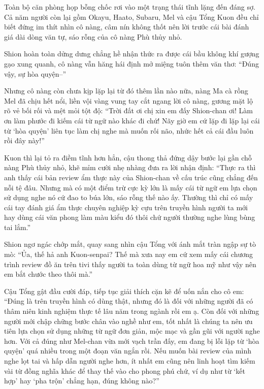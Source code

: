 \documentclass[../main.tex]{subfiles}
\begin{document}
Toàn bộ căn phòng họp bỗng chốc rơi vào một trạng thái tĩnh lặng đến đáng sợ. Cả năm người còn lại gồm Okayu, Haato, Subaru, Mel và cậu Tổng Kuon đều chỉ biết đứng im thít nhìn cô nàng, câm nín không thốt nên lời trước cái bài đánh giá dài dòng văn tự, sáo rỗng của cô nàng Phù thủy nhỏ.


Shion hoàn toàn dửng dưng chẳng hề nhận thức ra được cái bầu không khí gượng gạo xung quanh, cô nàng vẫn hăng hái định mở miệng tuôn thêm văn thơ: ``Đúng vậy, sự hòa quyện--''

Nhưng cô nàng còn chưa kịp lặp lại từ đó thêm lần nào nữa, nàng Ma cà rồng Mel đã chịu hết nổi, liền vội vàng vung tay cắt ngang lời cô nàng, gương mặt lộ rõ vẻ bối rối và mệt mỏi tột độ: ``Trời đất ơi chị xin em đấy Shion-chan ơi! Làm ơn làm phước đi kiếm cái từ ngữ nào khác đi chứ! Nãy giờ em cứ lặp đi lặp lại cái từ `hòa quyện' liên tục làm chị nghe mà muốn rối não, nhức hết cả cái đầu luôn rồi đây này!''

Kuon thì lại tỏ ra điềm tĩnh hơn hẳn, cậu thong thả đứng dậy bước lại gần chỗ nàng Phù thủy nhỏ, khẽ mỉm cười nhẹ nhàng đưa ra lời nhận định: ``Thực ra thì anh thấy cái bản review ẩm thực này của Shion-chan về cấu trúc cũng chẳng đến nỗi tệ đâu. Nhưng mà có một điểm trừ cực kỳ lớn là mấy cái từ ngữ em lựa chọn sử dụng nghe nó cứ đao to búa lớn, sáo rỗng thế nào ấy. Thường thì chỉ có mấy cái tay đánh giá ẩm thực chuyên nghiệp kỳ cựu trên truyền hình người ta mới hay dùng cái văn phong làm màu kiểu đó thôi chứ người thường nghe lùng bùng tai lắm.''

Shion ngơ ngác chớp mắt, quay sang nhìn cậu Tổng với ánh mắt tràn ngập sự tò mò: ``Ủa, thế hả anh Kuon-senpai? Thế mà xưa nay em cứ xem mấy cái chương trình review đồ ăn trên tivi thấy người ta toàn dùng từ ngữ hoa mỹ như vậy nên em bắt chước theo thôi mà.''

Cậu Tổng gật đầu cười đáp, tiếp tục giải thích cặn kẽ để uốn nắn cho cô em: ``Đúng là trên truyền hình có dùng thật, nhưng đó là đối với những người đã có thâm niên kinh nghiệm thực tế lâu năm trong ngành rồi em ạ. Còn đối với những người mới chập chững bước chân vào nghề như em, tốt nhất là chúng ta nên ưu tiên lựa chọn sử dụng những từ ngữ đơn giản, mộc mạc và gần gũi với người nghe hơn. Với cả đúng như Mel-chan vừa mới vạch trần đấy, em đang bị lỗi lặp từ `hòa quyện' quá nhiều trong một đoạn văn ngắn rồi. Nếu muốn bài review của mình nghe lọt tai và hấp dẫn người nghe hơn, ít nhất em cũng nên linh hoạt tìm kiếm vài từ đồng nghĩa khác để thay thế vào cho phong phú chứ, ví dụ như từ `kết hợp' hay `pha trộn' chẳng hạn, đúng không nào?''
\end{document}

